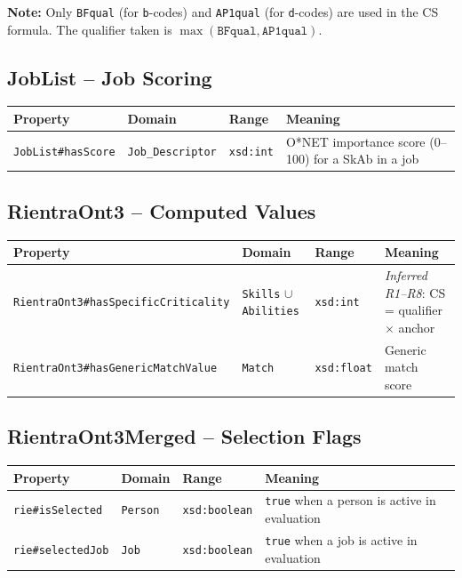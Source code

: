 ﻿\documentclass[12pt,a4paper]{article}
\begin{document}
\noindent\textbf{Note:} Only \texttt{BFqual} (for \texttt{b}-codes) and \texttt{AP1qual} (for \texttt{d}-codes) are used in the CS formula. The qualifier taken is $\max(\texttt{BFqual}, \texttt{AP1qual})$.

\subsection{JobList -- Job Scoring}
\begin{longtable}{@{}llll@{}}
\toprule
\textbf{Property} & \textbf{Domain} & \textbf{Range} & \textbf{Meaning} \\
\midrule
\endhead
\texttt{JobList\#hasScore} & \texttt{Job\_Descriptor} & \texttt{xsd:int} & O*NET importance score (0--100) for a SkAb in a job \\
\bottomrule
\end{longtable}

\subsection{RientraOnt3 -- Computed Values}
\begin{longtable}{@{}llll@{}}
\toprule
\textbf{Property} & \textbf{Domain} & \textbf{Range} & \textbf{Meaning} \\
\midrule
\endhead
\texttt{RientraOnt3\#hasSpecificCriticality} & \texttt{Skills} $\cup$ \texttt{Abilities} & \texttt{xsd:int} & \textit{Inferred R1--R8}: CS = qualifier $\times$ anchor \\
\texttt{RientraOnt3\#hasGenericMatchValue} & \texttt{Match} & \texttt{xsd:float} & Generic match score \\
\bottomrule
\end{longtable}

\subsection{RientraOnt3Merged -- Selection Flags}
\begin{longtable}{@{}llll@{}}
\toprule
\textbf{Property} & \textbf{Domain} & \textbf{Range} & \textbf{Meaning} \\
\midrule
\endhead
\texttt{rie\#isSelected} & \texttt{Person} & \texttt{xsd:boolean} & \texttt{true} when a person is active in evaluation \\
\texttt{rie\#selectedJob} & \texttt{Job} & \texttt{xsd:boolean} & \texttt{true} when a job is active in evaluation \\
\bottomrule
\end{longtable}
\end{document}
